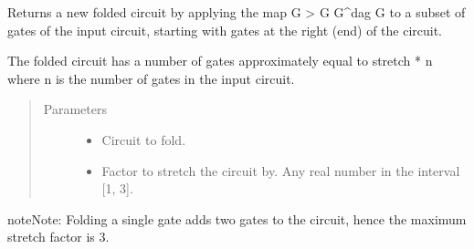 \documentclass[letterpaper,10pt,english]{sphinxmanual}
\begin{document}
\begin{fulllineitems}
\label{\detokenize{apidoc:mitiq.folding_cirq.fold_gates_from_right}}
Returns a new folded circuit by applying the map G \sphinxhyphen{}\textgreater{} G G\textasciicircum{}dag G to a subset of gates of the input circuit,
starting with gates at the right (end) of the circuit.

The folded circuit has a number of gates approximately equal to stretch * n where n is the number of gates in
the input circuit.
\begin{quote}\begin{description}
\item[{Parameters}] \leavevmode\begin{itemize}
\item {} 
 \sphinxhyphen{}\sphinxhyphen{} Circuit to fold.

\item {} 
 \sphinxhyphen{}\sphinxhyphen{} Factor to stretch the circuit by. Any real number in the interval {[}1, 3{]}.

\end{itemize}

\end{description}\end{quote}

\begin{sphinxadmonition}{note}{Note:}
Folding a single gate adds two gates to the circuit, hence the maximum stretch factor is 3.
\end{sphinxadmonition}

\end{fulllineitems}

\end{document}
